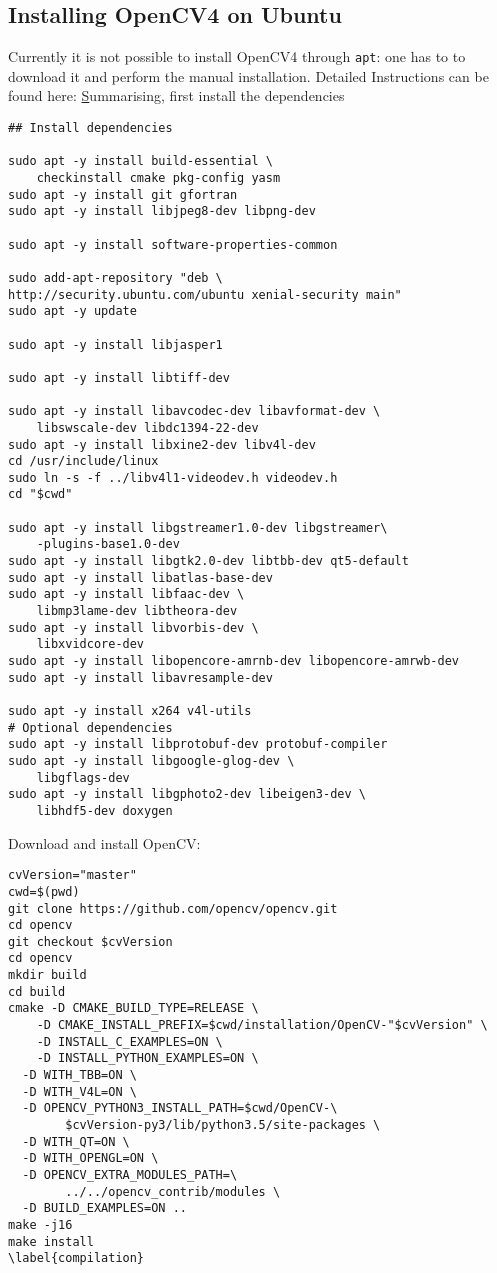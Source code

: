 \documentclass[12pt, letterpaper]{article}
\theoremstyle{definition}
\begin{document}
\subsection{Installing OpenCV4 on Ubuntu}
Currently it is not possible to install OpenCV4 through \lstinline+apt+: one has to to download it and perform the manual installation.
Detailed Instructions can be found here:
\href{https://www.learnopencv.com/install-opencv-4-on-ubuntu-18-04/}
Summarising, first install the dependencies
\begin{lstlisting}
## Install dependencies

sudo apt -y install build-essential \
	checkinstall cmake pkg-config yasm
sudo apt -y install git gfortran
sudo apt -y install libjpeg8-dev libpng-dev

sudo apt -y install software-properties-common

sudo add-apt-repository "deb \
http://security.ubuntu.com/ubuntu xenial-security main"
sudo apt -y update

sudo apt -y install libjasper1

sudo apt -y install libtiff-dev

sudo apt -y install libavcodec-dev libavformat-dev \
	libswscale-dev libdc1394-22-dev
sudo apt -y install libxine2-dev libv4l-dev
cd /usr/include/linux
sudo ln -s -f ../libv4l1-videodev.h videodev.h
cd "$cwd"

sudo apt -y install libgstreamer1.0-dev libgstreamer\
	-plugins-base1.0-dev
sudo apt -y install libgtk2.0-dev libtbb-dev qt5-default
sudo apt -y install libatlas-base-dev
sudo apt -y install libfaac-dev \
	libmp3lame-dev libtheora-dev
sudo apt -y install libvorbis-dev \
	libxvidcore-dev
sudo apt -y install libopencore-amrnb-dev libopencore-amrwb-dev
sudo apt -y install libavresample-dev

sudo apt -y install x264 v4l-utils
# Optional dependencies
sudo apt -y install libprotobuf-dev protobuf-compiler
sudo apt -y install libgoogle-glog-dev \
	libgflags-dev
sudo apt -y install libgphoto2-dev libeigen3-dev \
	libhdf5-dev doxygen
\end{lstlisting}

Download and install OpenCV:
\begin{lstlisting}
cvVersion="master"
cwd=$(pwd)
git clone https://github.com/opencv/opencv.git
cd opencv
git checkout $cvVersion
cd opencv
mkdir build
cd build
cmake -D CMAKE_BUILD_TYPE=RELEASE \
	-D CMAKE_INSTALL_PREFIX=$cwd/installation/OpenCV-"$cvVersion" \
    -D INSTALL_C_EXAMPLES=ON \
    -D INSTALL_PYTHON_EXAMPLES=ON \
  -D WITH_TBB=ON \
  -D WITH_V4L=ON \
  -D OPENCV_PYTHON3_INSTALL_PATH=$cwd/OpenCV-\
  		$cvVersion-py3/lib/python3.5/site-packages \
  -D WITH_QT=ON \
  -D WITH_OPENGL=ON \
  -D OPENCV_EXTRA_MODULES_PATH=\
  		../../opencv_contrib/modules \
  -D BUILD_EXAMPLES=ON ..
make -j16
make install
\label{compilation}
\end{lstlisting}
\end{document}
